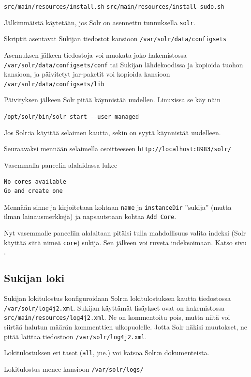 \documentclass[12pt]{article}
\begin{document}
\verb=src/main/resources/install.sh=
\verb=src/main/resources/install-sudo.sh=

Jälkimmäistä käytetään, jos Solr on asennettu tunnuksella \verb=solr=.

Skriptit asentavat Sukijan tiedostot kansioon
\verb|/var/solr/data/configsets|


\bigskip
Asennuksen jälkeen tiedostoja voi muokata joko hakemistossa
\verb|/var/solr/data/configsets/conf| tai Sukijan lähdekoodissa ja
kopioida tuohon kansioon, ja päivitetyt jar-paketit voi kopioida
kansioon \verb|/var/solr/data/configsets/lib|

Päivityksen jälkeen Solr pitää käynnistää uudellen. Linuxissa se käy
näin

\verb|/opt/solr/bin/solr start --user-managed|

Jos Solr:ia käyttää selaimen kautta, sekin on syytä käynnistää
uudelleen.


\bigskip
Seuraavaksi mennään selaimella osoitteeseen \verb=http://localhost:8983/solr/=

Vasemmalla paneelin alalaidassa lukee 

\begin{verbatim}
No cores available
Go and create one
\end{verbatim}

Mennään sinne ja kirjoitetaan kohtaan \verb=name= ja \verb=instanceDir=
''sukija'' (mutta ilman lainausmerkkejä) ja napsautetaan kohtaa
\verb=Add Core=.

Nyt vasemmalle paneeliin alalaitaan pitäisi tulla mahdollisuus valita
indeksi (Solr käyttää siitä nimeä \verb=core=) sukija. Sen jälkeen voi
ruveta indeksoimaan. Katso sivu .


\subsection*{Sukijan loki}

Sukijan lokitulostus konfiguroidaan Solr:n lokitulostuksen kautta
tiedostossa \verb=/var/solr/log4j2.xml=. Sukijan käyttämät lisäykset
ovat on hakemistossa \verb=src/main/resources/log4j2.xml=. Ne on
kommentoitu pois, mutta niitä voi siirtää halutun määrän kommenttien
ulkopuolelle. Jotta Solr näkisi muutokset, ne pitää laittaa tiedostoon
\verb=/var/solr/log4j2.xml=.

Lokitulostuksen eri tasot (\verb=all=, jne.) voi katsoa Solr:n
dokumenteista.

Lokitulostus menee kansioon \verb=/var/solr/logs/=
\end{document}
